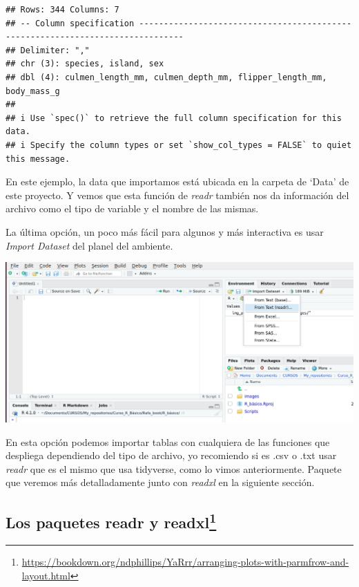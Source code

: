 \documentclass[
]{book}
\begin{document}
\begin{verbatim}
## Rows: 344 Columns: 7
## -- Column specification -------------------------------------------------------------------------------
## Delimiter: ","
## chr (3): species, island, sex
## dbl (4): culmen_length_mm, culmen_depth_mm, flipper_length_mm, body_mass_g
## 
## i Use `spec()` to retrieve the full column specification for this data.
## i Specify the column types or set `show_col_types = FALSE` to quiet this message.
\end{verbatim}

\hfill\break

En este ejemplo, la data que importamos está ubicada en la carpeta de `Data' de este proyecto.
Y vemos que esta función de \emph{readr} también nos da información del archivo como el tipo de variable y el nombre de las mismas.

La última opción, un poco más fácil para algunos y más interactiva es usar \emph{Import Dataset} del planel del ambiente.

\begin{center}\includegraphics[width=500pt]{images//import} \end{center}

En esta opción podemos importar tablas con cualquiera de las funciones que despliega dependiendo del tipo de archivo, yo recomiendo si es .csv o .txt usar \emph{readr} que es el mismo que usa tidyverse, como lo vimos anteriormente.
Paquete que veremos más detalladamente junto con \emph{readxl} en la siguiente sección.

\subsection[Los paquetes readr y readxl]{\texorpdfstring{Los paquetes readr y readxl\footnote{\url{https://bookdown.org/ndphillips/YaRrr/arranging-plots-with-parmfrow-and-layout.html}}}{Los paquetes readr y readxl}}\label{los-paquetes-readr-y-readxl1}
\end{document}
